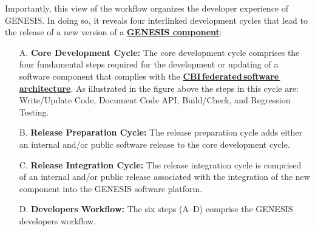 \documentclass[12pt]{article}
\begin{document}
Importantly, this view of the workflow organizes the developer experience of GENESIS. In doing so, it reveals four interlinked development cycles that lead to the release of a new version of a \href{../reserved-words/reserved-words.tex}{\bf GENESIS component}:
\begin{itemize}
   \item[A.]{\bf Core Development Cycle:} The core development cycle comprises the four fundamental steps required for the development or updating of a software component that complies with the \href{../genesis-overview/genesis-overview.tex}{\bf CBI\,federated\,software\,architecture}. As illustrated in the figure above the steps in this cycle are: Write/Update Code, Document Code API, Build/Check, and Regression Testing.
   \item[B.]{\bf Release Preparation Cycle:} The release preparation cycle adds either an internal and/or public software release to the core development cycle.
   \item[C.]{\bf Release Integration Cycle:} The release integration cycle is comprised of an internal and/or public release associated with the integration of the new component into the GENESIS software platform.
   \item[D.]{\bf Developers Workflow:} The six steps (A--D) comprise the GENESIS developers workflow.
\end{itemize}
\end{document}
